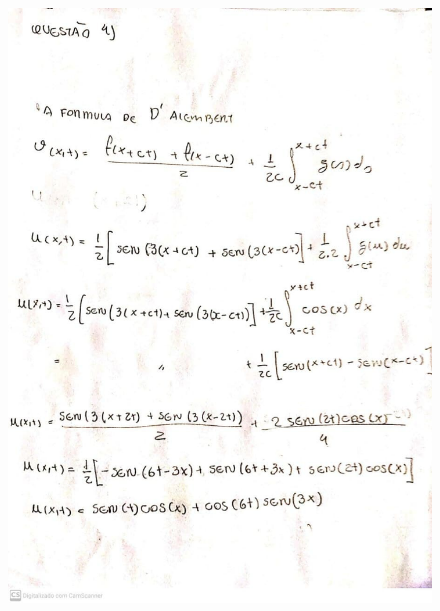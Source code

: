\documentclass[a4paper]{article}
\begin{document}
    \section{ }
        \begin{figure}{\textwidth}
        \centering
        \includegraphics[width=\textwidth]{4.jpg}
    \end{figure}
\end{document}
